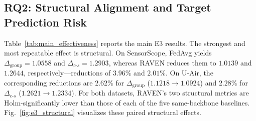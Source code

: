 \documentclass[letterpaper,journal]{IEEEtran}
\begin{document}
\subsection{RQ2: Structural Alignment and Target Prediction Risk}
\label{subsec:eval_rq2}

Table~\ref{tab:main_effectiveness} reports the main E3 results.  The strongest
and most repeatable effect is structural.  On SensorScope, FedAvg yields
$\Delta_{\mathrm{group}}=1.0558$ and
$\Delta_{c\text{-}s}=1.2903$, whereas RAVEN reduces them to $1.0139$ and
$1.2644$, respectively---reductions of $3.96\%$ and $2.01\%$.  On U-Air,
the corresponding reductions are $2.62\%$ for
$\Delta_{\mathrm{group}}$ ($1.1218\rightarrow1.0924$) and $2.28\%$ for
$\Delta_{c\text{-}s}$ ($1.2621\rightarrow1.2334$).
For both datasets, RAVEN's two structural metrics are Holm-significantly lower
than those of each of the five same-backbone baselines.  Fig.~\ref{fig:e3_structural}
visualizes these paired structural effects.
\end{document}

